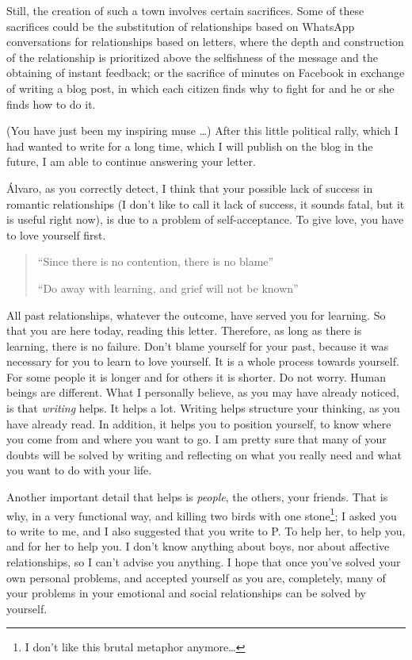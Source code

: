 \documentclass[]{book}
\let\rmarkdownfootnote\footnote%
\def\footnote{\protect\rmarkdownfootnote}
\begin{document}
Still, the creation of such a town involves certain sacrifices. Some of these sacrifices could be the substitution of relationships based on WhatsApp conversations for relationships based on letters, where the depth and construction of the relationship is prioritized above the selfishness of the message and the obtaining of instant feedback; or the sacrifice of minutes on Facebook in exchange of writing a blog post, in which each citizen finds why to fight for and he or she finds how to do it.

(You have just been my inspiring muse \ldots) After this little political rally, which I had wanted to write for a long time, which I will publish on the blog in the future, I am able to continue answering your letter.

Álvaro, as you correctly detect, I think that your possible lack of success in romantic relationships (I don't like to call it lack of success, it sounds fatal, but it is useful right now), is due to a problem of self-acceptance. To give love, you have to love yourself first.

\begin{quote}
``Since there is no contention, there is no blame''

``Do away with learning, and grief will not be known''

\citep{ta1984tao}
\end{quote}

All past relationships, whatever the outcome, have served you for learning. So that you are here today, reading this letter. Therefore, as long as there is learning, there is no failure. Don't blame yourself for your past, because it was necessary for you to learn to love yourself. It is a whole process towards yourself. For some people it is longer and for others it is shorter. Do not worry. Human beings are different. What I personally believe, as you may have already noticed, is that \emph{writing} helps. It helps a lot. Writing helps structure your thinking, as you have already read. In addition, it helps you to position yourself, to know where you come from and where you want to go. I am pretty sure that many of your doubts will be solved by writing and reflecting on what you really need and what you want to do with your life.

Another important detail that helps is \emph{people}, the others, your friends. That is why, in a very functional way, and killing two birds with one stone\footnote{I don't like this brutal metaphor anymore\ldots{}}; I asked you to write to me, and I also suggested that you write to P. To help her, to help you, and for her to help you. I don't know anything about boys, nor about affective relationships, so I can't advise you anything. I hope that once you've solved your own personal problems, and accepted yourself as you are, completely, many of your problems in your emotional and social relationships can be solved by yourself.
\end{document}
